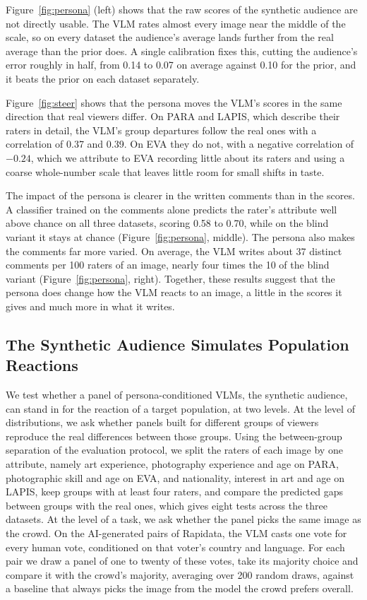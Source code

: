 \documentclass[runningheads]{llncs}
\begin{document}
Figure~\ref{fig:persona} (left) shows that the raw scores of the synthetic audience are not directly usable. The VLM rates almost every image near the middle of the scale, so on every dataset the audience's average lands further from the real average than the prior does. A single calibration fixes this, cutting the audience's error roughly in half, from 0.14 to 0.07 on average against 0.10 for the prior, and it beats the prior on each dataset separately.

Figure~\ref{fig:steer} shows that the persona moves the VLM's scores in the same direction that real viewers differ. On PARA and LAPIS, which describe their raters in detail, the VLM's group departures follow the real ones with a correlation of 0.37 and 0.39. On EVA they do not, with a negative correlation of $-0.24$, which we attribute to EVA recording little about its raters and using a coarse whole-number scale that leaves little room for small shifts in taste.

The impact of the persona is clearer in the written comments than in the scores. A classifier trained on the comments alone predicts the rater's attribute well above chance on all three datasets, scoring 0.58 to 0.70, while on the blind variant it stays at chance (Figure~\ref{fig:persona}, middle). The persona also makes the comments far more varied. On average, the VLM writes about 37 distinct comments per 100 raters of an image, nearly four times the 10 of the blind variant (Figure~\ref{fig:persona}, right). Together, these results suggest that the persona does change how the VLM reacts to an image, a little in the scores it gives and much more in what it writes.

\subsection{The Synthetic Audience Simulates Population Reactions}
\label{sec:audience}
\label{sec:generated}

We test whether a panel of persona-conditioned VLMs, the synthetic audience, can stand in for the reaction of a target population, at two levels. At the level of distributions, we ask whether panels built for different groups of viewers reproduce the real differences between those groups. Using the between-group separation of the evaluation protocol, we split the raters of each image by one attribute, namely art experience, photography experience and age on PARA, photographic skill and age on EVA, and nationality, interest in art and age on LAPIS, keep groups with at least four raters, and compare the predicted gaps between groups with the real ones, which gives eight tests across the three datasets. At the level of a task, we ask whether the panel picks the same image as the crowd. On the AI-generated pairs of Rapidata, the VLM casts one vote for every human vote, conditioned on that voter's country and language. For each pair we draw a panel of one to twenty of these votes, take its majority choice and compare it with the crowd's majority, averaging over 200 random draws, against a baseline that always picks the image from the model the crowd prefers overall.
\end{document}

